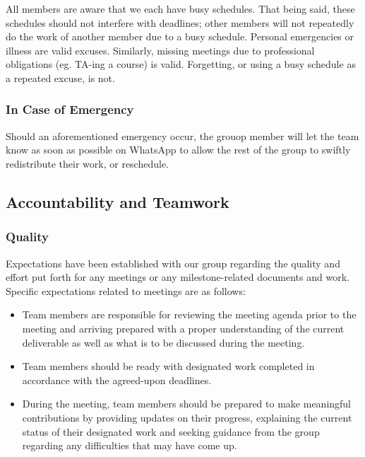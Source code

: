 \documentclass{article}
\begin{document}

All members are aware that we each have busy schedules. That being said, these 
schedules should not interfere with deadlines; other members will not repeatedly 
do the work of another member due to a busy schedule. Personal emergencies or illness 
are valid excuses. Similarly, missing meetings due to professional obligations (eg. 
TA-ing a course) is valid. Forgetting, or using a busy schedule as a repeated excuse, is not.

\subsubsection*{In Case of Emergency}

Should an aforementioned emergency occur, the grouop member will let the team know as 
soon as possible on WhatsApp to allow the rest of the group to swiftly redistribute 
their work, or reschedule.

\subsection*{Accountability and Teamwork}

\subsubsection*{Quality}

Expectations have been established with our group regarding the quality and effort put forth for any meetings or any
milestone-related documents and work.\\

Specific expectations related to meetings are as follows:
\begin{itemize}
    \item Team members are responsible for reviewing the meeting agenda prior to the meeting and arriving prepared
    with a proper understanding of the current deliverable as well as what is to be discussed during the meeting.
    \item Team members should be ready with designated work completed in accordance with the agreed-upon deadlines.
    \item During the meeting, team members should be prepared to make meaningful contributions by providing updates
    on their progress, explaining the current status of their designated work and seeking guidance from the group
    regarding any  difficulties that may have come up.
\end{itemize}
\end{document}
